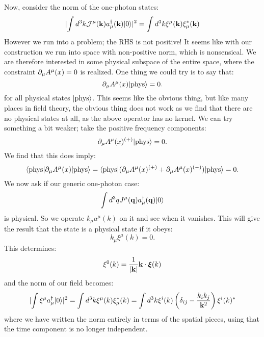 Now, consider the norm of the one-photon states:
\begin{equation}
    \lvert \int d^3k \mathcal{J}^\mu(\mathbf{k})a_\mu^\dagger(\mathbf{k})\lvert 0 \rangle \rvert^2 = \int d^3k \xi^\mu(\mathbf{k})\xi^*_\mu(\mathbf{k})
\end{equation}
However we run into a problem; the RHS is not positive! It seems like with our construction we run into space with non-positive norm, which is nonsensical. We are therefore interested in some physical subspace of the entire space, where the constraint $\partial_\mu A^\mu(x) = 0$ is realized. One thing we could try is to say that:
\begin{equation}
    \partial_\mu A^\mu(x)\lvert \text{phys} \rangle = 0.
\end{equation}
for all physical states $\lvert \text{phys} \rangle$. This seems like the obvious thing, but like many places in field theory, the obvious thing does not work as we find that there are no physical states at all, as the above operator has no kernel. We can try something a bit weaker; take the positive frequency components:
\begin{equation}
    \partial_\mu A^{\mu}(x)^{(+)}\lvert \text{phys} \rangle = 0.
\end{equation}
We find that this does imply:
\begin{equation}
    \langle \text{phys} \rvert\partial_\mu A^{\mu}(x)\lvert \text{phys} \rangle = \langle \text{phys} \rvert(\partial_\mu A^{\mu}(x)^{(+)} + \partial_\mu A^{\mu}(x)^{(-)})\lvert \text{phys} \rangle = 0.
\end{equation}
We now ask if our generic one-photon case:
\begin{equation}
    \int d^3q J^\mu(\mathbf{q})a^\dagger_\mu(\mathbf{q})\lvert 0 \rangle
\end{equation}
is physical. So we operate $k_\mu a^\mu(k)$ on it and see when it vanishes. This will give the result that the state is a physical state if it obeys:
\begin{equation}
    k_\mu \xi^\mu(k) = 0.
\end{equation}
This determines:
\begin{equation}
    \xi^0(k) = \frac{1}{\lvert \mathbf{k} \rvert}\mathbf{k} \cdot \mbox{\boldmath$ \xi $}(k)
\end{equation}
and the norm of our field becomes:
\begin{equation}
    \lvert \int \xi^\mu a_\mu^\dagger\lvert 0 \rangle \rvert^2 = \int d^3k \xi^\mu(k)\xi^*_\mu(k) = \int d^3k \xi^i(k)\left(\delta_{ij} - \frac{k_ik_j}{\mathbf{k}^2}\right)\xi^i(k)^*
\end{equation}
where we have written the norm entirely in terms of the spatial pieces, using that the time component is no longer independent.

